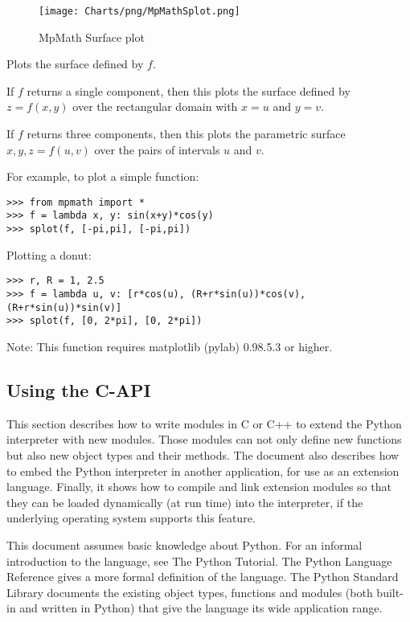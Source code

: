 \begin{figure}[ht]
	\centering
	\texttt{[image: Charts/png/MpMathSplot.png]}
	\caption{MpMath Surface plot}
	\label{Fig MpMath Surface plot}
\end{figure}


Plots the surface defined by $f$.

\vpara
If $f$ returns a single component, then this plots the surface defined by $z=f(x,y)$ over the rectangular domain with $x=u$  and $y=v$.

\vpara
If $f$ returns three components, then this plots the parametric surface $x,y,z = f(u,v)$ over the pairs of intervals $u$ and $v$.

\vpara
For example, to plot a simple function:

\begin{lstlisting}
>>> from mpmath import *
>>> f = lambda x, y: sin(x+y)*cos(y)
>>> splot(f, [-pi,pi], [-pi,pi])
\end{lstlisting}


Plotting a donut:

\begin{lstlisting}
>>> r, R = 1, 2.5
>>> f = lambda u, v: [r*cos(u), (R+r*sin(u))*cos(v), (R+r*sin(u))*sin(v)]
>>> splot(f, [0, 2*pi], [0, 2*pi])
\end{lstlisting}


Note: This function requires matplotlib (pylab) 0.98.5.3 or higher.


\subsection{Using the C-API}

This section describes how to write modules in C or C++ to extend the Python interpreter with new modules. Those modules can not only define new functions but also new object types and their methods. The document also describes how to embed the Python interpreter in another application, for use as an extension language. Finally, it shows how to compile and link extension modules so that they can be loaded dynamically (at run time) into the interpreter, if the underlying operating system supports this feature.

This document assumes basic knowledge about Python. For an informal introduction to the language, see The Python Tutorial. The Python Language Reference gives a more formal definition of the language. The Python Standard Library documents the existing object types, functions and modules (both built-in and written in Python) that give the language its wide application range.

